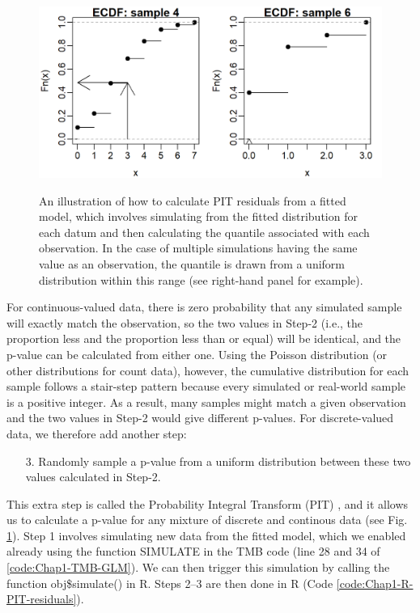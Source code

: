 \begin{figure}[!ht]
    \caption[Illustrating PIT residuals]{An illustration of how to calculate PIT residuals from a fitted model, which involves simulating from the fitted distribution for each datum and then calculating the quantile associated with each observation.  In the case of multiple simulations having the same value as an observation, the quantile is drawn from a uniform distribution within this range (see right-hand panel for example).}
    \centering
    \includegraphics[width=5.5in]{Chap_1/simulation_residuals_res50.png}
    \label{fig:Chap1_PIT_example}
\end{figure}

\lstset{style=Rcode}


For continuous-valued data, there is zero probability that any simulated sample will exactly match the observation, so the two values in Step-2 (i.e., the proportion less and the proportion less than or equal) will be identical, and the p-value can be calculated from either one.  Using the Poisson distribution (or other distributions for count data), however, the cumulative distribution for each sample follows a stair-step pattern because every simulated or real-world sample is a positive integer.  As a result, many samples might match a given observation and the two values in Step-2 would give different p-values.  For discrete-valued data, we therefore add another step:
\begin{enumerate}
    \item[3.] Randomly sample a p-value from a uniform distribution between these two values calculated in Step-2.
\end{enumerate}
This extra step is called the Probability Integral Transform (PIT) \cite{dunn_randomized_1996}, and it allows us to calculate a p-value for any mixture of discrete and continous data (see Fig. \ref{fig:Chap1_PIT_example}).  Step 1 involves simulating new data from the fitted model, which we enabled already using the function \colorbox{backblue}{SIMULATE} in the TMB code (line 28 and 34 of \ref{code:Chap1-TMB-GLM}).  We can then trigger this simulation by calling the function \colorbox{backcolour}{obj\$simulate()} in R.  Steps 2--3 are then done in R (Code \ref{code:Chap1-R-PIT-residuals}).

